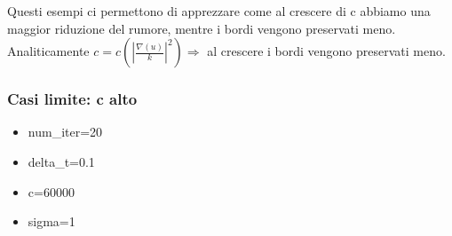 Questi esempi ci permettono di apprezzare come al crescere di c abbiamo una maggior riduzione del rumore, mentre i bordi vengono preservati meno.\\
Analiticamente $c=c(|\frac{\nabla(u)}{k}|^2)\Longrightarrow$ al crescere i bordi vengono preservati meno.\\

\newpage
\subsubsection{Casi limite: c alto}
\begin{itemize}
    \item num\_iter=20
    \item delta\_t=0.1
    \item c=60000
    \item sigma=1
\end{itemize}


